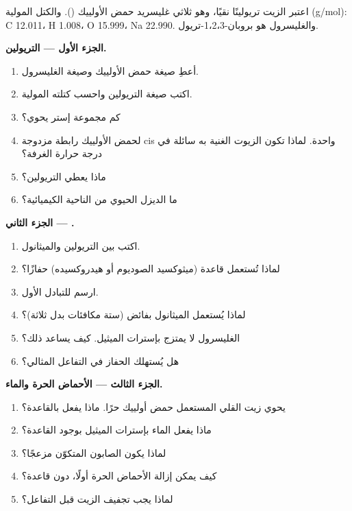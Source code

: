 \begin{problem}
\label{pb:b2:acyl-substitution:1}
اعتبر الزيت تريولينًا نقيًا، وهو ثلاثي غليسريد حمض الأولييك (). والكتل المولية
(\unit{g/mol}): C 12.011، H 1.008، O 15.999، Na 22.990. والغليسرول هو بروبان-1،2،3-تريول.

\medskip
\noindent\textbf{الجزء الأول --- التريولين.}
\begin{enumerate}
  \item أعطِ صيغة حمض الأولييك وصيغة الغليسرول.
  \item اكتب صيغة التريولين واحسب كتلته المولية.
  \item كم مجموعة إستر يحوي؟
  \item لحمض الأولييك رابطة مزدوجة cis واحدة. لماذا تكون الزيوت الغنية به سائلة في درجة حرارة الغرفة؟
  \item ماذا يعطي  التريولين؟
  \item ما الديزل الحيوي من الناحية الكيميائية؟
\end{enumerate}

\medskip
\noindent\textbf{الجزء الثاني --- .}
\begin{enumerate}[resume]
  \item اكتب  بين التريولين والميثانول.
  \item لماذا تُستعمل قاعدة (ميثوكسيد الصوديوم أو هيدروكسيده) حفازًا؟
  \item ارسم  للتبادل الأول.
  \item لماذا يُستعمل الميثانول بفائض (ستة مكافئات بدل ثلاثة)؟
  \item الغليسرول لا يمتزج بإسترات الميثيل. كيف يساعد ذلك؟
  \item هل يُستهلك الحفاز في التفاعل المثالي؟
\end{enumerate}

\medskip
\noindent\textbf{الجزء الثالث --- الأحماض الحرة والماء.}
\begin{enumerate}[resume]
  \item يحوي زيت القلي المستعمل حمض أولييك حرًا. ماذا يفعل بالقاعدة؟
  \item ماذا يفعل الماء بإسترات الميثيل بوجود القاعدة؟
  \item لماذا يكون الصابون المتكوّن مزعجًا؟
  \item كيف يمكن إزالة الأحماض الحرة أولًا، دون قاعدة؟
  \item لماذا يجب تجفيف الزيت قبل التفاعل؟
\end{enumerate}


\end{problem}
